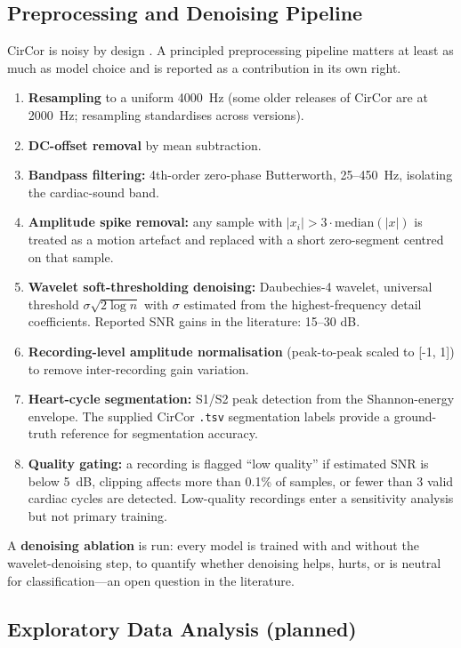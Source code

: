 \documentclass[10pt,twocolumn]{article}
\begin{document}
\subsection{Preprocessing and Denoising Pipeline}

CirCor is noisy by design \citep{circor_data}. A principled preprocessing pipeline matters at least as much as model choice and is reported as a contribution in its own right.

\begin{enumerate}
    \item \textbf{Resampling} to a uniform 4000~Hz (some older releases of CirCor are at 2000~Hz; resampling standardises across versions).
    \item \textbf{DC-offset removal} by mean subtraction.
    \item \textbf{Bandpass filtering:} 4th-order zero-phase Butterworth, 25--450~Hz, isolating the cardiac-sound band.
    \item \textbf{Amplitude spike removal:} any sample with $|x_i| > 3 \cdot \text{median}(|x|)$ is treated as a motion artefact and replaced with a short zero-segment centred on that sample.
    \item \textbf{Wavelet soft-thresholding denoising:} Daubechies-4 wavelet, universal threshold $\sigma\sqrt{2\log n}$ with $\sigma$ estimated from the highest-frequency detail coefficients. Reported SNR gains in the literature: 15--30 dB.
    \item \textbf{Recording-level amplitude normalisation} (peak-to-peak scaled to [-1, 1]) to remove inter-recording gain variation.
    \item \textbf{Heart-cycle segmentation:} S1/S2 peak detection from the Shannon-energy envelope. The supplied CirCor \texttt{.tsv} segmentation labels provide a ground-truth reference for segmentation accuracy.
    \item \textbf{Quality gating:} a recording is flagged ``low quality'' if estimated SNR is below 5~dB, clipping affects more than 0.1\% of samples, or fewer than 3 valid cardiac cycles are detected. Low-quality recordings enter a sensitivity analysis but not primary training.
\end{enumerate}

A \textbf{denoising ablation} is run: every model is trained with and without the wavelet-denoising step, to quantify whether denoising helps, hurts, or is neutral for classification---an open question in the literature.

\subsection{Exploratory Data Analysis (planned)}
\end{document}
